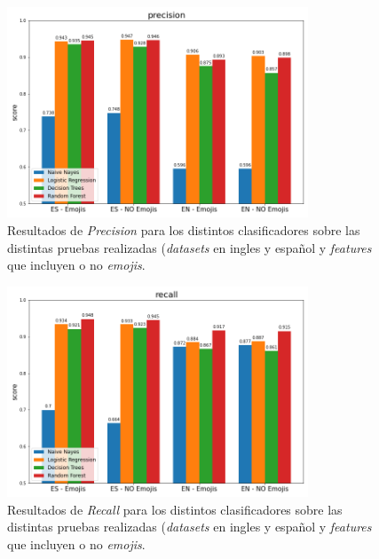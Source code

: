 \begin{figure}[H]
    \centering
    \includegraphics[width=0.8\textwidth]{results/mourning_tweets_precision.png}
    \caption{Resultados de \textit{Precision} para los distintos clasificadores sobre las distintas pruebas realizadas (\textit{datasets} en ingles y español y \textit{features} que incluyen o no \textit{emojis}.}
    \label{fig:mt_precision}
\end{figure}


\begin{figure}[H]
    \centering
    \includegraphics[width=0.8\textwidth]{results/mourning_tweets_recall.png}
    \caption{Resultados de \textit{Recall} para los distintos clasificadores sobre las distintas pruebas realizadas (\textit{datasets} en ingles y español y \textit{features} que incluyen o no \textit{emojis}.}
    \label{fig:mt_recall}
\end{figure}


